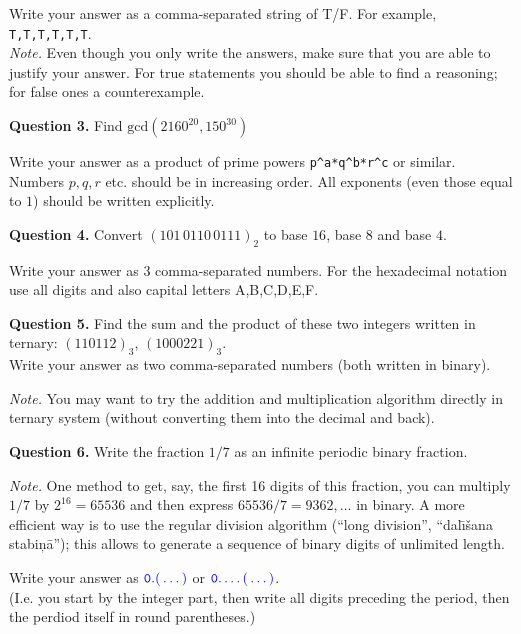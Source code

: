 \documentclass[jou]{apa6}
\begin{document}
Write your answer as a comma-separated string of T/F. For example, {\tt T,T,T,T,T,T}.\\
{\em Note.} Even though you only write the answers, 
make sure that you are able to justify your answer. For true statements you should be able to 
find a reasoning; for false ones \textendash{} a counterexample. 




\vspace{10pt}
{\bf Question 3.} Find $\text{gcd}(2160^{20},150^{30})$ 

Write your answer as a product of prime powers {\tt p\^{}a*q\^{}b*r\^{}c} or similar.
Numbers $p,q,r$ etc. should be in increasing order. All exponents (even those equal to $1$) should be written explicitly.



\vspace{10pt}
{\bf Question 4.}
Convert $(101\,0110\,0111)_2$ to base $16$, base $8$ and base $4$.

Write your answer as $3$ comma-separated numbers. 
For the hexadecimal notation use all digits and also capital letters 
A,B,C,D,E,F.



\vspace{10pt}
{\bf Question 5.} Find the sum and the product of these two integers written in ternary: 
$(110112)_3$, $(1000221)_3$.\\

Write your answer as two comma-separated numbers (both written in binary). 

{\em Note.} You may want to try the addition and multiplication algorithm directly in 
ternary system (without converting them into the decimal and back).



\vspace{10pt}
{\bf Question 6.}
Write the fraction $1/7$ as an infinite periodic binary fraction.

{\em Note.} One method to get, say, the first 16 digits of this fraction, you can 
multiply $1/7$ by $2^{16} = 65536$ and then express $65536/7 = 9362,\ldots$ in binary. 
A more efficient way is to use the regular division algorithm (``long division'', 
``dal\={\i}\v{s}ana stabi\c{n}\={a}''); this allows to generate a sequence of
binary digits of unlimited length. 

Write your answer as $\textcolor{blue}{\mathtt{0.(}\ldots\mathtt{)}}$ or 
$\textcolor{blue}{\mathtt{0.}\ldots\mathtt{(}\ldots\mathtt{)}}$.\\
(I.e. you start by the integer part, then write all digits preceding the period, 
then the perdiod itself in round parentheses.)
\end{document}
